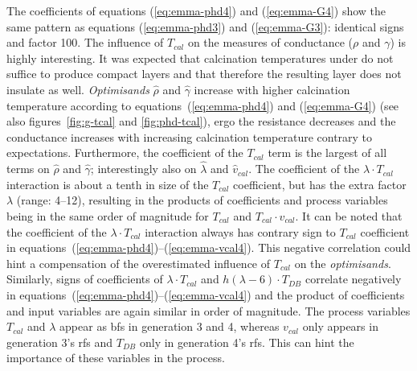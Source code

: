 The coefficients of equations (\ref{eq:emma-phd4}) and (\ref{eq:emma-G4}) show the same pattern 
as equations (\ref{eq:emma-phd3}) and (\ref{eq:emma-G3}): identical signs and factor 100. 
The influence of $T_{cal}$ on the measures of conductance ($\rho$ and $\gamma$) is highly interesting. 
It was expected that 
calcination temperatures under  do not suffice to produce compact layers and 
that therefore the resulting layer does not insulate as well. 
\textit{Optimisands} $\hat\rho$ and $\hat{\gamma}$ increase with higher calcination temperature 
according to equations~(\ref{eq:emma-phd4}) and (\ref{eq:emma-G4}) (see also figures~\ref{fig:g-tcal} and \ref{fig:phd-tcal}), 
ergo the resistance decreases and the conductance increases with increasing calcination temperature contrary to expectations.
Furthermore, the coefficient of the $T_{cal}$ term is the largest of all terms on $\hat{\rho}$ and $\hat{\gamma}$; interestingly also on $\hat\lambda$ and $\hat{v}_{cal}$.
The coefficient of the $\lambda\cdot T_{cal}$ interaction is about a tenth in size of the $T_{cal}$ coefficient, 
but has the extra factor $\lambda$ (range: 4--12), resulting in the products of coefficients and process variables being in the same order of magnitude for $T_{cal}$ and $T_{cal}\cdot v_{cal}$.
It can be noted that the coefficient of the $\lambda\cdot T_{cal}$ interaction always has contrary sign to $T_{cal}$ coefficient in equations~(\ref{eq:emma-phd4})--(\ref{eq:emma-vcal4}). 
This negative correlation could hint a compensation of the overestimated influence of $T_{cal}$ on the \textit{optimisands}.
Similarly, signs of coefficients of $\lambda \cdot T_{cal}$ and $h(\lambda -6) \cdot T_{DB}$ correlate negatively in equations~(\ref{eq:emma-phd4})--(\ref{eq:emma-vcal4}) and the product of coefficients and input variables are again similar in order of magnitude. 
%
The process variables $T_{cal}$ and $\lambda$ appear as \gls{bf}s in generation 3 and 4, whereas $v_{cal}$ only appears in generation 3's \gls{rf}s and $T_{DB}$ only in generation 4's \gls{rf}s.
This can hint the importance of these variables in the process. 

